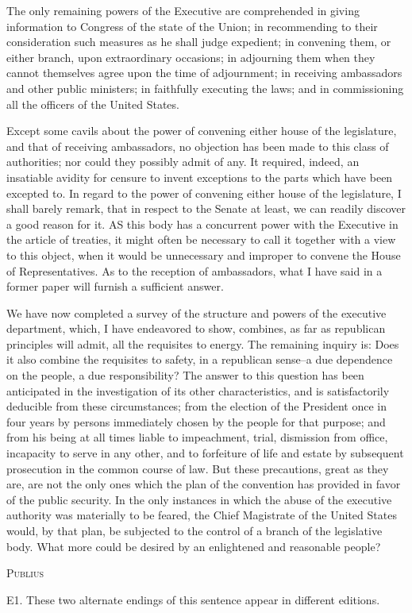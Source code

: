 The only remaining powers of the Executive are comprehended in giving information to Congress of the state of the Union; in recommending to their consideration such measures as he shall judge expedient; in convening them, or either branch, upon extraordinary occasions; in adjourning them when they cannot themselves agree upon the time of adjournment; in receiving ambassadors and other public ministers; in faithfully executing the laws; and in commissioning all the officers of the United States.

Except some cavils about the power of convening either house of the legislature, and that of receiving ambassadors, no objection has been made to this class of authorities; nor could they possibly admit of any. 
It required, indeed, an insatiable avidity for censure to invent exceptions to the parts which have been excepted to. 
In regard to the power of convening either house of the legislature, I shall barely remark, that in respect to the Senate at least, we can readily discover a good reason for it. 
AS this body has a concurrent power with the Executive in the article of treaties, it might often be necessary to call it together with a view to this object, when it would be unnecessary and improper to convene the House of Representatives. 
As to the reception of ambassadors, what I have said in a former paper will furnish a sufficient answer.

We have now completed a survey of the structure and powers of the executive department, which, I have endeavored to show, combines, as far as republican principles will admit, all the requisites to energy. 
The remaining inquiry is: Does it also combine the requisites to safety, in a republican sense--a due dependence on the people, a due responsibility? 
The answer to this question has been anticipated in the investigation of its other characteristics, and is satisfactorily deducible from these circumstances; from the election of the President once in four years by persons immediately chosen by the people for that purpose; and from his being at all times liable to impeachment, trial, dismission from office, incapacity to serve in any other, and to forfeiture of life and estate by subsequent prosecution in the common course of law. 
But these precautions, great as they are, are not the only ones which the plan of the convention has provided in favor of the public security. 
In the only instances in which the abuse of the executive authority was materially to be feared, the Chief Magistrate of the United States would, by that plan, be subjected to the control of a branch of the legislative body. 
What more could be desired by an enlightened and reasonable people?

\vspace{.5cm}
\textsc{Publius}

\vspace{1.5cm}

E1. 
These two alternate endings of this sentence appear in different editions.

